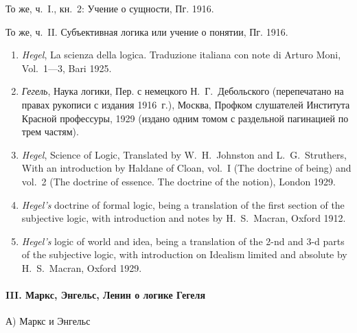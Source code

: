 То же, ч.~I., кн.~2: Учение о сущности, Пг. 1916.

То же, ч.~II. Субъективная логика или учение о понятии, Пг. 1916.

\begin{enumerate}
\item
{\em Hegel}, La scienza della logica. Traduzione italiana con note di
Arturo Moni, Vol.~1---3, Bari 1925.

\item
{\em Гегель}, Наука логики, Пер. с немецкого Н.~Г.~Дебольского
(перепечатано на правах рукописи с издания 1916~г.), Москва, Профком
слушателей Института Красной профессуры, 1929 (издано одним томом с
раздельной пагинацией по трем частям).

\item
{\em Hegel}, Science of Logic, Translated by W.~H.~Johnston and
L.~G.~Struthers, With an introduction by Haldane of Cloan, vol.~I
(The doctrine of being) and vol.~2 (The doctrine of essence. The doctrine of
 the notion), London 1929.

\item{\em Hegel's} doctrine of formal logic, being a translation of the first
section of the subjective logic, with introduction and notes by
H.~S.~Macran, Oxford 1912.

\item{\em Hegel's} logic of world and idea, being a translation of the 2-nd and
3-d parts of the subjective logic, with introduction on Idealism limited and
absolute by H.~S.~Macran, Oxford 1929.
\end{enumerate}

\paragraph[III. Маркс, Энгельс, Ленин о логике Гегеля]
{III. Маркс, Энгельс, Ленин о логике Гегеля}

{\centering А) Маркс и Энгельс \par}

